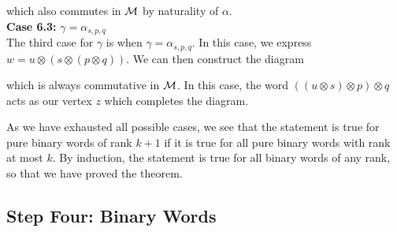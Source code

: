 \begin{prf}
\begin{center}
        \end{center}
        which also commutes in $\mathcal{M}$ by naturality of $\alpha$.
        \\
        \textbf{Case 6.3:} $\gamma = \alpha_{s,p,q}$\\
        The third case for $\gamma$ is when $\gamma = \alpha_{s,p,q}$. 
        In this case, we 
        express $w = u\otimes (s\otimes (p \otimes q))$. 
        We can then construct the diagram  
        \begin{center}
        \end{center}
        which is always commutative in $\mathcal{M}$.
        In this case, the word $((u\otimes s)\otimes p)\otimes q$
        acts as our vertex $z$ which completes the diagram. 

        As we have exhausted all possible cases,
        we see that the statement is true for pure binary words of rank $k+1$
        if it is true for all pure binary words with rank at most $k$.
        By induction, the statement is true for all binary words of any rank, 
        so that we have proved the theorem.
    \end{prf}

\newpage
\subsection*{Step Four: Binary Words}

